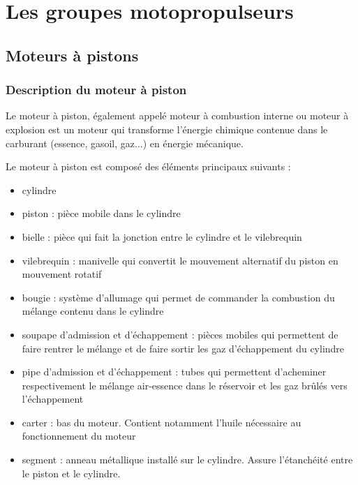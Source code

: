 

\section{Les groupes motopropulseurs}

	\subsection{Moteurs à pistons}
		\subsubsection{Description du moteur à piston}
		Le moteur à piston, également appelé moteur à combustion interne ou moteur à explosion est un moteur qui transforme l'énergie chimique contenue dans le carburant (essence, gasoil, gaz...) en énergie mécanique.
		\begin{figure}[H]
  		\centering
    		
		\end{figure}
		
		Le moteur à piston est composé des éléments principaux suivants :
		\begin{itemize}
			\item cylindre
			\item piston : pièce mobile dans le cylindre
			\item bielle : pièce qui fait la jonction entre le cylindre et le vilebrequin
			\item vilebrequin : manivelle qui convertit le mouvement alternatif du piston en mouvement rotatif
			\item bougie : système d'allumage qui permet de commander la combustion du mélange contenu dans le cylindre
			\item soupape d'admission et d'échappement : pièces mobiles qui permettent de faire rentrer le mélange et de faire sortir les gaz d'échappement du cylindre 
			\item pipe d'admission et d'échappement : tubes qui permettent d'acheminer respectivement le mélange air-essence dans le réservoir et les gaz brûlés vers l'échappement
			\item carter : bas du moteur. Contient notamment l'huile nécessaire au fonctionnement du moteur
			\item segment : anneau métallique installé sur le cylindre. Assure l'étanchéité entre le piston et le cylindre.
		\end{itemize}
	
